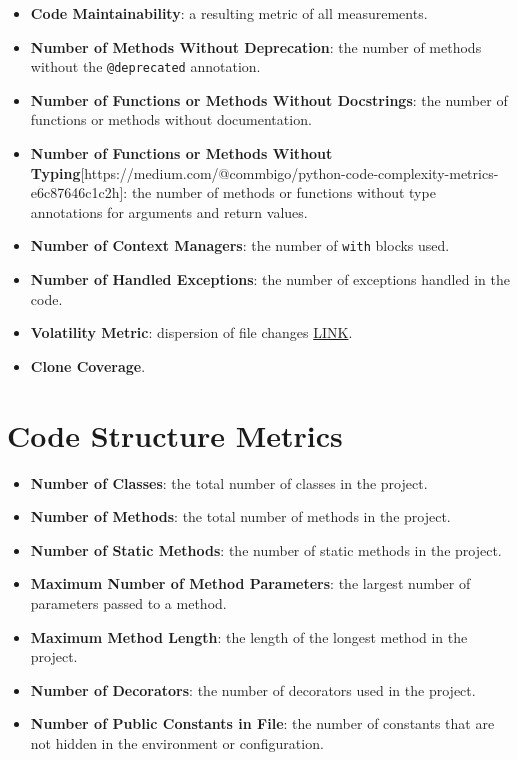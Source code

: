 \documentclass{article}
\begin{document}
\begin{itemize}
    \item \textbf{Code Maintainability}: a resulting metric of all measurements.
    \item \textbf{Number of Methods Without Deprecation}: the number of methods without the \texttt{@deprecated} annotation.
    \item \textbf{Number of Functions or Methods Without Docstrings}: the number of functions or methods without documentation.
    \item \textbf{Number of Functions or Methods Without Typing}[https://medium.com/@commbigo/python-code-complexity-metrics-e6c87646c1c2h]: the number of methods or functions without type annotations for arguments and return values.
    \item \textbf{Number of Context Managers}: the number of \texttt{with} blocks used.
    \item \textbf{Number of Handled Exceptions}: the number of exceptions handled in the code.
    \item \textbf{Volatility Metric}: dispersion of file changes \href{https://youtu.be/zN0gX9m6a2k?si=ACzi11hjNT9S82Qu&t=1956}{LINK}.
    \item \textbf{Clone Coverage}.
\end{itemize}

\section{Code Structure Metrics}

\begin{itemize}
    \item \textbf{Number of Classes}: the total number of classes in the project.
    \item \textbf{Number of Methods}: the total number of methods in the project.
    \item \textbf{Number of Static Methods}: the number of static methods in the project.
    \item \textbf{Maximum Number of Method Parameters}: the largest number of parameters passed to a method.
    \item \textbf{Maximum Method Length}: the length of the longest method in the project.
    \item \textbf{Number of Decorators}: the number of decorators used in the project.
    \item \textbf{Number of Public Constants in File}: the number of constants that are not hidden in the environment or configuration.
\end{itemize}
\end{document}
